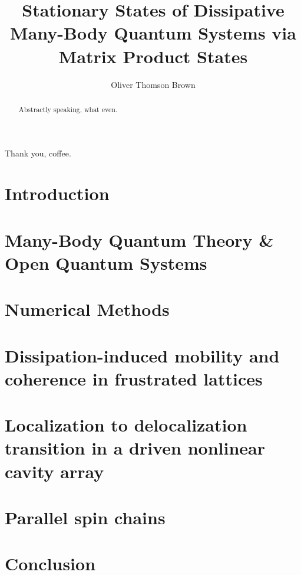 \documentclass[a4paper,oneside,12pt]{hwthesis}
\author{Oliver Thomson Brown}
\title{Stationary States of Dissipative Many-Body Quantum Systems via Matrix Product States}
\newcommand*{\chappath}{../../include/chapters}
\newcommand*{\refpath}{../../include/refs}
\begin{document}
\maketitle


\begin{acknowledgements}
Thank you, coffee.
\end{acknowledgements}

\begin{abstract}
Abstractly speaking, what even.
\end{abstract}

\tableofcontents

\chapter{Introduction}
\setcounter{page}{1}

\chapter{Many-Body Quantum Theory \& Open Quantum Systems}


\chapter{Numerical Methods}



\chapter{Dissipation-induced mobility and coherence in frustrated lattices}

\chapter{Localization to delocalization transition in a driven nonlinear cavity array}

\chapter{Parallel spin chains}

\chapter{Conclusion}



\end{document}
